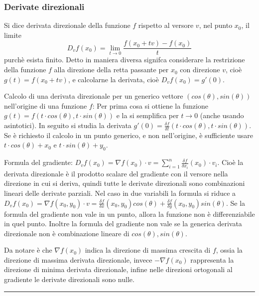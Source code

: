 \subsubsection*{Derivate direzionali}
Si dice derivata direzionale della funzione $f$ rispetto al versore $v$, nel punto $x_0$, il limite
\[
    D_vf(x_0) = \lim_{t\rightarrow 0}\frac{f(x_0 + tv) - f(x_0)}{t}
\]
purchè esista finito.\newline
Detto in maniera diversa signifca considerare la restrizione della funzione $f$ alla direzione della retta passante per $x_0$ con direzione $v$, cioè $g(t)= f(x_0+tv)$, e calcolarne la derivata, cioè $D_vf(x_0)= g'(0)$.\newline

Calcolo di una derivata direzionale per un generico vettore $(cos(\theta), sin(\theta))$ nell'origine di una funzione $f$: Per prima cosa si ottiene la funzione $g(t) = f(t \cdot cos(\theta), t \cdot sin(\theta))$ e la si semplifica per $t \rightarrow 0$ (anche usando asintotici). In seguito si studia la derivata $g'(0) = \frac{\delta f}{\delta t}(t \cdot cos(\theta), t \cdot sin(\theta))$.\newline
Se è richiesto il calcolo in un punto generico, e non nell'origine, è sufficiente usare $t \cdot cos(\theta) + x_0$ e $t \cdot sin(\theta) + y_0$.\newline

Formula del gradiente: $D_vf(x_0) = \nabla f(x_0) \cdot v =  \sum_{i=1}^{n} \frac{\delta f}{\delta x_i}(x_0) \cdot  v_i$. Cioè la derivata direzionale è il prodotto scalare del gradiente con il versore nella direzione in cui si deriva, quindi tutte le derivate direzionali sono combinazioni lineari delle derivate parziali. Nel caso in due variabili la formula si riduce a $D_vf(x_0) = \nabla f(x_0,y_0) \cdot v = \frac{\delta f}{\delta x} (x_0,y_0)cos(\theta) + \frac{\delta f}{\delta y}(x_0, y_0) sin(\theta)$.\newline
Se la formula del gradiente non vale in un punto, allora la funzione non è differenziabile in quel punto.\newline
Inoltre la formula del gradiente non vale se la generica derivata direzionale non è combinazione lineare di $cos(\theta), sin(\theta)$.\newline

Da notare è che $\nabla f(x_0)$ indica la direzione di massima crescita di $f$, ossia la direzione di massima derivata direzionale, invece $-\nabla f(x_0)$ rappresenta la direzione di minima derivata direzionale, infine nelle direzioni ortogonali al gradiente le derivate direzionali sono nulle. \newline
\rule{\textwidth}{0.4pt}
